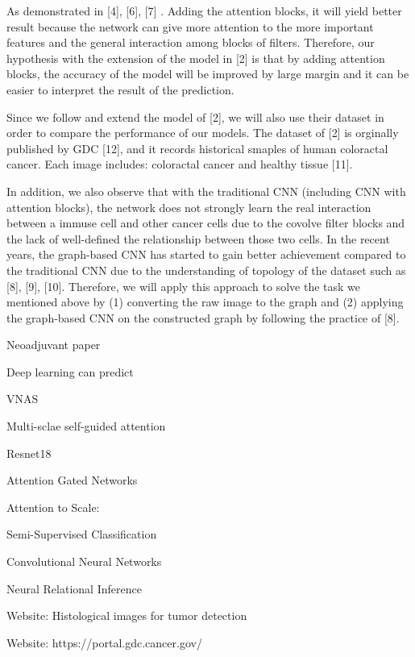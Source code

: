 \documentclass[letterpaper, 11 pt, journal]{ieeeconf}
\begin{document}
	As demonstrated in [4], [6], [7] . Adding the attention blocks, it will yield better result because the network can give more 
	attention to the more important features and the general interaction among blocks of filters. 
	Therefore, our hypothesis with the extension of the model in [2] is that by adding attention blocks, the accuracy of the model will be improved by large margin and 
	it can be easier to interpret the result of the prediction.

	Since we follow and extend the model of [2], we will also use their dataset in order to compare the performance of our models. The dataset of [2] is orginally 
	published by GDC [12], and it records historical smaples of human coloractal cancer. Each image includes: coloractal cancer and healthy tissue [11].
	
	In addition, we also observe that with the traditional CNN (including CNN with attention blocks), the network does not strongly learn the real 
	interaction between a immuse cell and other cancer cells due to the covolve filter blocks and the lack of well-defined the relationship between 
	those two cells.  In the recent years, the graph-based CNN has started to gain better achievement compared to the traditional CNN due to the understanding of topology of 
	the dataset such as [8], [9], [10]. Therefore, we will apply this approach to solve the task we mentioned above by (1) converting the raw image to the graph 
	and (2) applying the graph-based CNN on the constructed graph by following the practice of [8].

	
	\cleardoublepage
	
	

	\begin{thebibliography}{12}
		
		 Neoadjuvant paper

		 Deep learning can predict

		 VNAS

		 Multi-sclae self-guided attention

		 Resnet18

		 Attention Gated Networks

		 Attention to Scale:

		 Semi-Supervised Classification

		 Convolutional Neural Networks

		 Neural Relational Inference

		 Website: Histological images for tumor detection

		 Website: https://portal.gdc.cancer.gov/
		
	\end{thebibliography}
	
\end{document}
